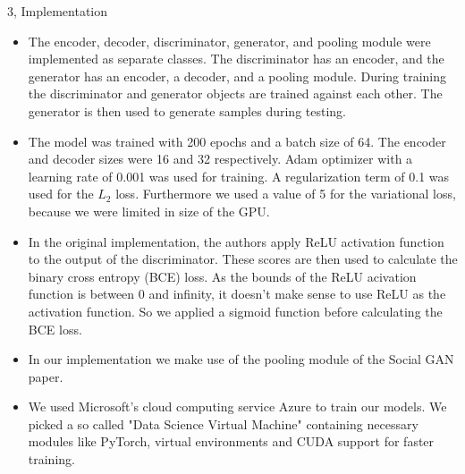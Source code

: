 \documentclass[10pt,a4paper]{article}
\begin{document}
\begin{task}{3, Implementation}
\begin{itemize}
    \item The encoder, decoder, discriminator, generator, and pooling module were implemented as separate classes. The discriminator has an encoder, and the generator has an encoder, a decoder, and a pooling module. During training the discriminator and generator objects are trained against each other. The generator is then used to generate samples during testing. \\ 
    \item The model was trained with 200 epochs and a batch size of 64. The encoder and decoder sizes were 16 and 32 respectively. Adam optimizer with a learning rate of 0.001 was used for training. A regularization term of 0.1 was used for the $L_2$ loss. Furthermore we used a value of 5 for the variational loss, because we were limited in size of the GPU. \\
    \item In the original implementation, the authors apply ReLU activation function to the output of the discriminator. These scores are then used to calculate the binary cross entropy (BCE) loss. As the bounds of the ReLU acivation function is between 0 and infinity, it doesn't make sense to use ReLU as the activation function. So we applied a sigmoid function before calculating the BCE loss.\\
    \item In our implementation we make use of the pooling module of the Social GAN paper.\\
    \item We used Microsoft's cloud computing service Azure to train our models. We picked a so called "Data Science Virtual Machine" containing necessary modules like PyTorch, virtual environments and CUDA support for faster training. 
\end{itemize}
\end{task}
\end{document}
